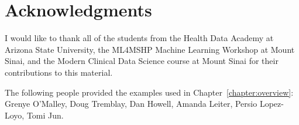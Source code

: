 \chapter{Acknowledgments}

I would like to thank all of the students from the Health Data Academy at Arizona State University, the ML4MSHP Machine Learning Workshop at Mount Sinai, and the Modern Clinical Data Science course at Mount Sinai for their contributions to this material.

The following people provided the examples used in Chapter~\ref{chapter:overview}: Grenye O'Malley, Doug Tremblay, Dan Howell, Amanda Leiter, Persio Lopez-Loyo, Tomi Jun. 

